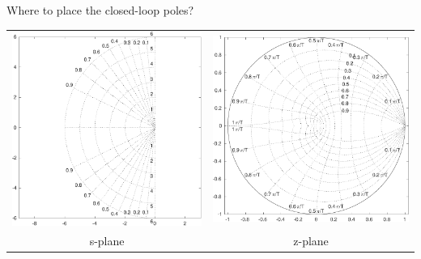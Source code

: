 \documentclass[presentation,aspectratio=169]{beamer}
\begin{document}
\begin{frame}[label=sec-3-9]{Where to place the closed-loop poles?}
\begin{center}
\begin{tabular}{cc}
 \includegraphics[width=0.41\linewidth]{../../figures/sgrid-crop}
& \includegraphics[width=0.43\linewidth]{../../figures/zgrid-crop}\\
s-plane & z-plane
\end{tabular}
\end{center}
\end{frame}
\end{document}
